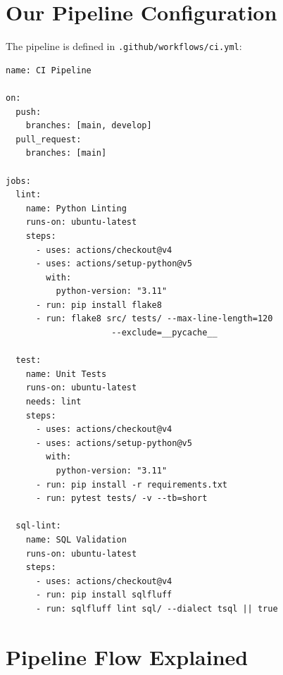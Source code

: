 \documentclass[12pt, a4paper, oneside]{report}
\begin{document}
\section{Our Pipeline Configuration}

The pipeline is defined in \texttt{.github/workflows/ci.yml}:

\begin{lstlisting}[style=yamlstyle, caption={.github/workflows/ci.yml --- our CI pipeline}]
name: CI Pipeline

on:
  push:
    branches: [main, develop]
  pull_request:
    branches: [main]

jobs:
  lint:
    name: Python Linting
    runs-on: ubuntu-latest
    steps:
      - uses: actions/checkout@v4
      - uses: actions/setup-python@v5
        with:
          python-version: "3.11"
      - run: pip install flake8
      - run: flake8 src/ tests/ --max-line-length=120
                     --exclude=__pycache__

  test:
    name: Unit Tests
    runs-on: ubuntu-latest
    needs: lint
    steps:
      - uses: actions/checkout@v4
      - uses: actions/setup-python@v5
        with:
          python-version: "3.11"
      - run: pip install -r requirements.txt
      - run: pytest tests/ -v --tb=short

  sql-lint:
    name: SQL Validation
    runs-on: ubuntu-latest
    steps:
      - uses: actions/checkout@v4
      - run: pip install sqlfluff
      - run: sqlfluff lint sql/ --dialect tsql || true
\end{lstlisting}

\section{Pipeline Flow Explained}
\end{document}
